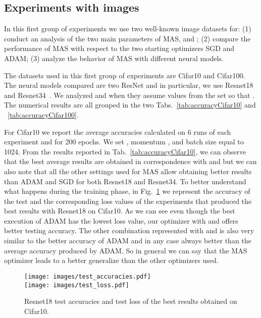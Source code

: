 \documentclass[10pt,twocolumn,letterpaper]{article}
\begin{document}
\subsection{Experiments with images}
In this first group of experiments we use two well-known image datasets for: (1) conduct an analysis of the two main parameters of MAS,  and ; (2) compare the performance of MAS with respect to the two starting optimizers SGD and ADAM; (3) analyze the behavior of MAS with different neural models.

The datasets used in this first group of experiments are Cifar10 and Cifar100.
The neural models compared are two ResNet and in particular, we use Resnet18 and Resnet34~\cite{He2015,targ2016resnet}.
We analyzed  and  when they assume values from the set  so that .
The numerical results are all grouped in the two Tabs.~\ref{tab:accuracyCifar10} and ~\ref{tab:accuracyCifar100}.

For Cifar10 we report the average accuracies calculated on 6 runs of each experiment and for 200 epochs.
We set , momentum , and batch size equal to 1024.
From the results reported in Tab.~\ref{tab:accuracyCifar10}, we can observe that the best average results are obtained in correspondence with  and  but we can also note that all the other settings used for MAS allow obtaining better results than ADAM and SGD for both Resnet18 and Resnet34.
To better understand what happens during the training phase, in Fig.~\ref{fig:cifar10-test-accuracies} we represent the accuracy of the test and the corresponding loss values of the experiments that produced the best results with Resnet18 on Cifar10.
As we can see even though the best execution of ADAM has the lowest loss value, our optimizer with  and  offers better testing accuracy.
The other combination represented with  and  is also very similar to the better accuracy of ADAM and in any case always better than the average accuracy produced by ADAM.
So in general we can say that the MAS optimizer leads to a better generalize than the other optimizers used.



\begin{figure}
    \centering
    \texttt{[image: images/test\_accuracies.pdf]}\\
    \texttt{[image: images/test\_loss.pdf]}
    \caption{Resnet18 test accuracies and test loss of the best results obtained on Cifar10.}
    \label{fig:cifar10-test-accuracies}
\end{figure}
\end{document}
